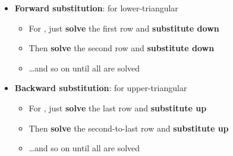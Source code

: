 \begin{itemize}

      \item
            \textbf{Forward substitution}: for lower-triangular

            \begin{itemize}

                  \item
                        For , just \textbf{solve} the first row
                        and \textbf{substitute down}
                  \item
                        Then \textbf{solve} the second row
                        and \textbf{substitute down}
                  \item
                        \ldots and so on until all  are solved
            \end{itemize}
      \item
            \textbf{Backward substitution}: for upper-triangular

            \begin{itemize}

                  \item
                        For , just \textbf{solve} the last row
                        and \textbf{substitute up}
                  \item
                        Then \textbf{solve} the second-to-last row
                        and \textbf{substitute up}
                  \item
                        \ldots and so on until all  are solved
            \end{itemize}
\end{itemize}